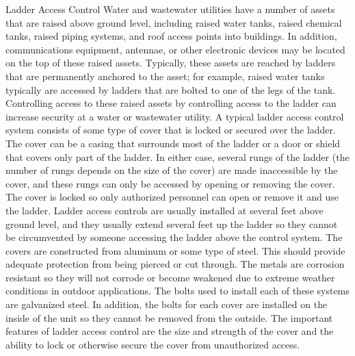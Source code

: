 \documentclass{article}
\begin{document}
Ladder Access Control Water and wastewater utilities have a number of
assets that are raised above ground level, including raised water tanks,
raised chemical tanks, raised piping systems, and roof access points
into buildings. In addition, communications equipment, antennae, or
other electronic devices may be located on the top of these raised
assets. Typically, these assets are reached by ladders that are
permanently anchored to the asset; for example, raised water tanks
typically are accessed by ladders that are bolted to one of the legs of
the tank. Controlling access to these raised assets by controlling
access to the ladder can increase security at a water or wastewater
utility. A typical ladder access control system consists of some type of
cover that is locked or secured over the ladder. The cover can be a
casing that surrounds most of the ladder or a door or shield that covers
only part of the ladder. In either case, several rungs of the ladder
(the number of rungs depends on the size of the cover) are made
inaccessible by the cover, and these rungs can only be accessed by
opening or removing the cover. The cover is locked so only authorized
personnel can open or remove it and use the ladder. Ladder access
controls are usually installed at several feet above ground level, and
they usually extend several feet up the ladder so they cannot be
circumvented by someone accessing the ladder above the control system.
The covers are constructed from aluminum or some type of steel. This
should provide adequate protection from being pierced or cut through.
The metals are corrosion resistant so they will not corrode or become
weakened due to extreme weather conditions in outdoor applications. The
bolts used to install each of these systems are galvanized steel. In
addition, the bolts for each cover are installed on the inside of the
unit so they cannot be removed from the outside. The important features
of ladder access control are the size and strength of the cover and the
ability to lock or otherwise secure the cover from unauthorized access.
\end{document}
